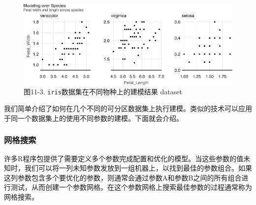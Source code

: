 \documentclass[
]{article}
\newenvironment{Shaded}{\begin{snugshade}}{\end{snugshade}}
\newcommand{\DataTypeTok}[1]{\textcolor[rgb]{0.13,0.29,0.53}{#1}}
\newcommand{\KeywordTok}[1]{\textcolor[rgb]{0.13,0.29,0.53}{\textbf{#1}}}
\newcommand{\NormalTok}[1]{#1}
\newcommand{\OperatorTok}[1]{\textcolor[rgb]{0.81,0.36,0.00}{\textbf{#1}}}
\newcommand{\StringTok}[1]{\textcolor[rgb]{0.31,0.60,0.02}{#1}}
\begin{document}
\begin{Shaded}
\end{Shaded}

\begin{figure}
\centering
\includegraphics{figures/11_3.png}
\caption{图11-3. \texttt{iris}数据集在不同物种上的建模结果 dataset}
\end{figure}

我们简单介绍了如何在几个不同的可分区数据集上执行建模。类似的技术可以应用于同一个数据集上的使用不同参数的建模。下面就会介绍。

\hypertarget{ux7f51ux683cux641cux7d22}{%
\subsubsection{网格搜索}\label{ux7f51ux683cux641cux7d22}}

许多R程序包提供了需要定义多个参数完成配置和优化的模型。当这些参数的值未知时，我们可以将一列未知参数发放到一组机器上，以找到最佳的参数组合。如果这列参数包含多个要优化的参数，则通常会通过参数A和参数B之间的所有组合进行测试，从而创建一个参数网格。在这个参数网格上搜索最佳参数的过程通常称为网格搜索。
\end{document}

